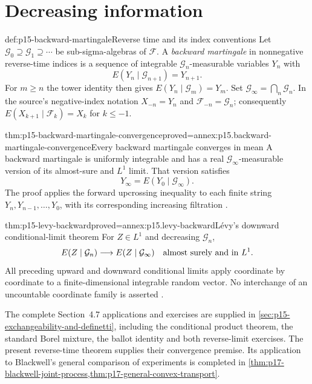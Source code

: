 \section{Decreasing information}
\label{sec:p15-decreasing-information}

\begin{hbdefinition}{def:p15-backward-martingale}{Reverse time and its index conventions}
Let \(\mathcal G_0\supseteq\mathcal G_1\supseteq\cdots\)
be sub-sigma-algebras of \(\mathcal F\).
A \emph{backward martingale} in nonnegative reverse-time indices is a
sequence of integrable \(\mathcal G_n\)-measurable variables \(Y_n\) with
\[
                        E(Y_n\mid\mathcal G_{n+1})=Y_{n+1}.
\]
For \(m\geq n\) the tower identity then gives
\(E(Y_n\mid\mathcal G_m)=Y_m\).
Set \(\mathcal G_\infty=\bigcap_n\mathcal G_n\).
In the source's negative-index notation \(X_{-n}=Y_n\) and
\(\mathcal F_{-n}=\mathcal G_n\); consequently
\(E(X_{k+1}\mid\mathcal F_k)=X_k\) for \(k\leq-1\).
\end{hbdefinition}

\begin{hbtheorem}{thm:p15-backward-martingale-convergence}{proved=annex:p15.backward-martingale-convergence}{Every backward martingale converges in mean}
A backward martingale is uniformly integrable and has a real
\(\mathcal G_\infty\)-measurable version of its almost-sure and \(L^1\)
limit. That version satisfies
\[
                    Y_\infty=E(Y_0\mid\mathcal G_\infty).
\]
The proof applies the forward upcrossing inequality to each finite
string \(Y_n,Y_{n-1},\ldots,Y_0\), with its corresponding increasing
filtration \cite[thms.~4.7.1--2]{DurrettPTEAuthor2019}.
\end{hbtheorem}

\begin{hbtheorem}{thm:p15-levy-backward}{proved=annex:p15.levy-backward}{L\'evy's downward conditional-limit theorem}
For \(Z\in L^1\) and decreasing \(\mathcal G_n\),
\[
              E(Z\mid\mathcal G_n)\longrightarrow
              E(Z\mid\mathcal G_\infty)
                        \quad\hbox{almost surely and in }L^1.
\]
All preceding upward and downward conditional limits apply coordinate
by coordinate to a finite-dimensional integrable random vector.
No interchange of an uncountable coordinate family is asserted
\cite[thm.~4.7.3]{DurrettPTEAuthor2019}.
\end{hbtheorem}

The complete Section~4.7 applications and exercises are supplied in
\cref{sec:p15-exchangeability-and-definetti}, including the conditional
product theorem, the standard Borel mixture, the ballot identity and
both reverse-limit exercises. The present reverse-time theorem
supplies their convergence premise. Its application to Blackwell's general
comparison of experiments is completed in
\cref{thm:p17-blackwell-joint-process,thm:p17-general-convex-transport}.
